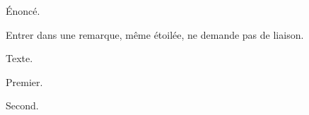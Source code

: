 \begin{exercise}
  Énoncé.
\end{exercise}
\vspace*{0.5em}
\begin{remark*}
  Entrer dans une remarque, même étoilée, ne demande pas de liaison.
\end{remark*}

Texte.

\begin{exercise*}
  Premier.
\end{exercise*}
\begin{exercise*}
  Second.
\end{exercise*}
